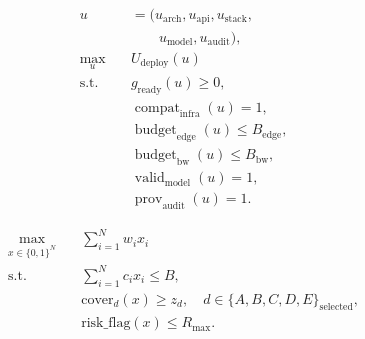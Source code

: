 \begin{equation}
    \begin{aligned}
        u                 & = (u_{\mathrm{arch}},u_{\mathrm{api}},u_{\mathrm{stack}},       \\
                          & \qquad u_{\mathrm{model}},u_{\mathrm{audit}}),                  \\
        \max_{u} \quad    & U_{\mathrm{deploy}}(u)                                          \\
        \text{s.t.} \quad & g_{\mathrm{ready}}(u) \ge 0,                                    \\
                          & \operatorname{compat}_{\mathrm{infra}}(u)=1,                    \\
                          & \operatorname{budget}_{\mathrm{edge}}(u) \le B_{\mathrm{edge}}, \\
                          & \operatorname{budget}_{\mathrm{bw}}(u) \le B_{\mathrm{bw}},     \\
                          & \operatorname{valid}_{\mathrm{model}}(u)=1,                     \\
                          & \operatorname{prov}_{\mathrm{audit}}(u)=1.
    \end{aligned}
\end{equation}

\begin{equation}
    \begin{aligned}
        \max_{x \in \{0,1\}^N}\quad & \sum_{i=1}^{N} w_i x_i                                                     \\
        \text{s.t.}\quad            & \sum_{i=1}^{N} c_i x_i \le B,                                              \\
                                    & \mathrm{cover}_d(x) \ge z_d,\quad d \in \{A,B,C,D,E\}_{\mathrm{selected}}, \\
                                    & \mathrm{risk\_flag}(x) \le R_{\max}.
    \end{aligned}
\end{equation}
